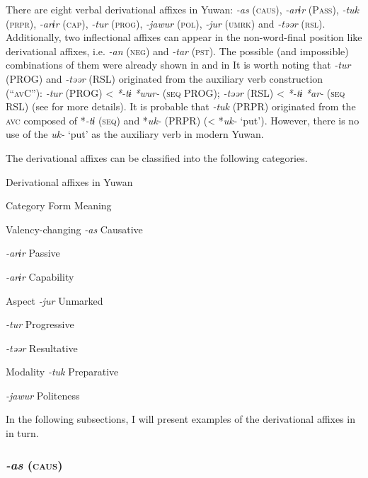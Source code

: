 There are eight verbal derivational affixes in Yuwan: \textit{{}-as} (\textsc{caus}), \textit{{}-arɨr} (P\textsc{ass}), \textit{{}-tuk} (\textsc{prpr}), \textit{-arɨr} (\textsc{cap}), \textit{{}-tur} (\textsc{prog}), \textit{{}-jawur} (\textsc{pol}), \textit{-jur} (\textsc{umrk}) and \textit{{}-təər} (\textsc{rsl}). Additionally, two inflectional affixes can appear in the non-word-final position like derivational affixes, i.e. \textit{{}-an} (\textsc{neg}) and \textit{{}-tar} (\textsc{pst}). The possible (and impossible) combinations of them were already shown in  and  in  It is worth noting that \textit{-tur} (PROG) and \textit{{}-təər} (RSL) originated from the auxiliary verb construction (“\textsc{av}C”): \textit{{}-tur} (PROG) < \textit{*-tɨ} \textit{*wur-} (\textsc{seq} PROG); \textit{{}-təər} (RSL) < \textit{*-tɨ} \textit{*ar-} (\textsc{seq} RSL) (see  for more details). It is probable that \textit{{}-tuk} (PRPR) originated from the \textsc{avc} composed of *\textit{{}-tɨ} (\textsc{seq}) and *\textit{uk-} (PRPR) (< *\textit{uk-} ‘put’). However, there is no use of the \textit{uk-} ‘put’ as the auxiliary verb in modern Yuwan.

  The derivational affixes can be classified into the following categories.

\begin{table}
\caption{\label{tab:key:84}Derivational affixes in Yuwan}

Category  Form  Meaning

Valency-changing  \textit{{}-as} Causative

  \textit{{}-arɨr} Passive

  \textit{{}-arɨr} Capability

Aspect  \textit{{}-jur} Unmarked

  \textit{{}-tur} Progressive

  \textit{{}-təər} Resultative

Modality  \textit{{}-tuk} Preparative

  \textit{{}-jawur} Politeness
\end{table}

In the following subsections, I will present examples of the derivational affixes in  in turn.

\subsubsection{\textit{{}-as} (\textsc{caus})}

